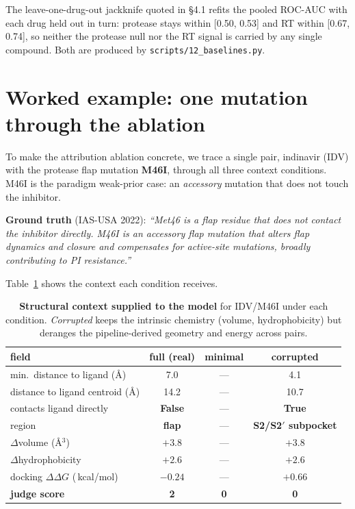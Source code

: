 \documentclass{article}
\newcommand{\ddg}{\ensuremath{\Delta\Delta G}}
\newcommand{\kcal}{\,kcal/mol}
\begin{document}
The leave-one-drug-out jackknife quoted in \S4.1 refits the pooled ROC-AUC with
each drug held out in turn: protease stays within [0.50, 0.53] and RT within
[0.67, 0.74], so neither the protease null nor the RT signal is carried by any
single compound. Both are produced by \texttt{scripts/12\_baselines.py}.

\section{Worked example: one mutation through the ablation}
\label{app:worked}

To make the attribution ablation concrete, we trace a single pair, indinavir
(IDV) with the protease flap mutation \textbf{M46I}, through all three context
conditions. M46I is the paradigm weak-prior case: an \emph{accessory} mutation
that does not touch the inhibitor.

\textbf{Ground truth} (IAS-USA 2022): \emph{``Met46 is a flap residue that does
not contact the inhibitor directly. M46I is an accessory flap mutation that
alters flap dynamics and closure and compensates for active-site mutations,
broadly contributing to PI resistance.''}

Table~\ref{tab:worked} shows the context each condition receives.

\begin{table}[h]
\centering
\caption{\textbf{Structural context supplied to the model} for IDV/M46I under each condition. \emph{Corrupted} keeps the intrinsic chemistry (volume, hydrophobicity) but deranges the pipeline-derived geometry and energy across pairs.}
\label{tab:worked}
\begin{tabular}{lccc}
\toprule
field & full (real) & minimal & corrupted \\
\midrule
min.\ distance to ligand (\AA)  & 7.0 & --- & 4.1 \\
distance to ligand centroid (\AA) & 14.2 & --- & 10.7 \\
contacts ligand directly        & \textbf{False} & --- & \textbf{True} \\
region                          & \textbf{flap} & --- & \textbf{S2/S2$'$ subpocket} \\
$\Delta$volume (\AA$^3$)        & $+3.8$ & --- & $+3.8$ \\
$\Delta$hydrophobicity          & $+2.6$ & --- & $+2.6$ \\
docking \ddg{} (\kcal)          & $-0.24$ & --- & $+0.66$ \\
\midrule
\textbf{judge score} & \textbf{2} & \textbf{0} & \textbf{0} \\
\bottomrule
\end{tabular}
\end{table}
\end{document}
